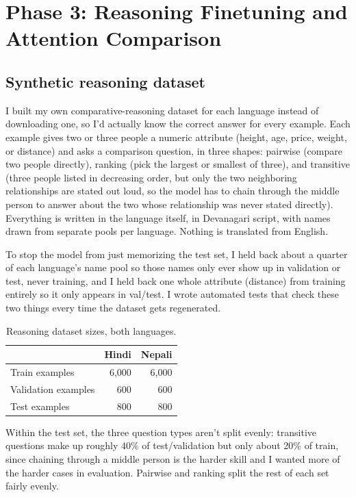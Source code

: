 \documentclass[10pt]{article}
\begin{document}
\section{Phase 3: Reasoning Finetuning and Attention Comparison}

\subsection{Synthetic reasoning dataset}

I built my own comparative-reasoning dataset for each language instead of downloading one, so I'd actually know the correct answer for every example. Each example gives two or three people a numeric attribute (height, age, price, weight, or distance) and asks a comparison question, in three shapes: pairwise (compare two people directly), ranking (pick the largest or smallest of three), and transitive (three people listed in decreasing order, but only the two neighboring relationships are stated out loud, so the model has to chain through the middle person to answer about the two whose relationship was never stated directly). Everything is written in the language itself, in Devanagari script, with names drawn from separate pools per language. Nothing is translated from English.

To stop the model from just memorizing the test set, I held back about a quarter of each language's name pool so those names only ever show up in validation or test, never training, and I held back one whole attribute (distance) from training entirely so it only appears in val/test. I wrote automated tests that check these two things every time the dataset gets regenerated.

\begin{table}[h]
\centering
\small
\begin{tabular}{lrr}
\toprule
 & Hindi & Nepali \\
\midrule
Train examples & 6,000 & 6,000 \\
Validation examples & 600 & 600 \\
Test examples & 800 & 800 \\
\bottomrule
\end{tabular}
\caption{Reasoning dataset sizes, both languages.}
\end{table}

Within the test set, the three question types aren't split evenly: transitive questions make up roughly 40\% of test/validation but only about 20\% of train, since chaining through a middle person is the harder skill and I wanted more of the harder cases in evaluation. Pairwise and ranking split the rest of each set fairly evenly.
\end{document}
